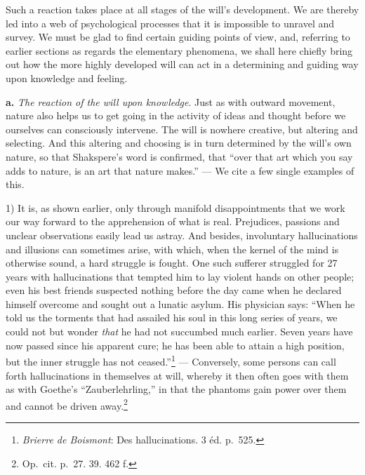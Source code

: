 \documentclass[12pt,a4paper]{book}
\newcommand{\opage}[1]{\marginnote{\footnotesize\textit{[#1]}}}
\begin{document}
Such a reaction takes place at all stages of the will's development. We
are thereby led into a web of psychological processes that it is
impossible to unravel and survey. We must be glad to find certain guiding
points of view, and, referring to earlier sections as regards the
elementary phenomena, we shall here chiefly bring out how the more highly
developed will can act in a determining and guiding way upon knowledge
and feeling.

\opage{385}\textbf{a.} \emph{The reaction of the will upon knowledge}.
Just as with outward movement, nature also helps us to get going in the
activity of ideas and thought before we ourselves can consciously
intervene. The will is nowhere creative, but altering and selecting. And
this altering and choosing is in turn determined by the will's own
nature, so that Shakspere's word is confirmed, that ``over that art which you
say adds to nature, is an art that nature makes.'' ---
We cite a few single examples of this.

1) It is, as shown earlier, only through manifold disappointments that
we work our way forward to the apprehension of what is real. Prejudices,
passions and unclear observations easily lead us astray. And besides,
involuntary hallucinations and illusions can sometimes arise, with which,
when the kernel of the mind is otherwise sound, a hard struggle is
fought. One such sufferer struggled for 27 years with hallucinations that
tempted him to lay violent hands on other people; even his best friends
suspected nothing before the day came when he declared himself overcome
and sought out a lunatic asylum. His physician says: ``When he told us
the torments that had assailed his soul in this long series of years, we
could not but wonder \emph{that} he had not succumbed much earlier. Seven
years have now passed since his apparent cure; he has been able to attain
a high position, but the inner struggle has not
ceased.''\footnote{\emph{Brierre de Boismont}: Des hallucinations. 3 éd.
p.~525.} --- Conversely, some persons can call forth hallucinations in
themselves at will, whereby it then often goes with them as with Goethe's
``Zauberlehrling,'' in that the phantoms gain power over them and cannot
be driven away.\footnote{Op.\ cit. p.~27. 39. 462 f.}
\end{document}
